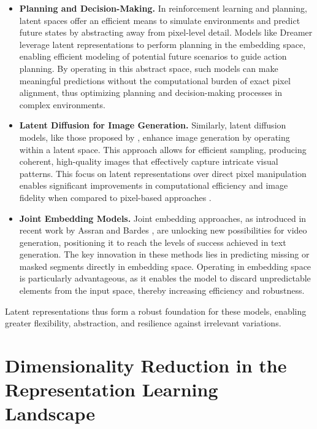 \begin{itemize}
    \item \textbf{Planning and Decision-Making.} In reinforcement learning and planning, latent spaces offer an efficient means to simulate environments and predict future states by abstracting away from pixel-level detail. Models like Dreamer \citep{hafner2019dream} leverage latent representations to perform planning in the embedding space, enabling efficient modeling of potential future scenarios to guide action planning. By operating in this abstract space, such models can make meaningful predictions without the computational burden of exact pixel alignment, thus optimizing planning and decision-making processes in complex environments.
    
    \item \textbf{Latent Diffusion for Image Generation.} Similarly, latent diffusion models, like those proposed by \cite{rombach2022high}, enhance image generation by operating within a latent space. This approach allows for efficient sampling, producing coherent, high-quality images that effectively capture intricate visual patterns. This focus on latent representations over direct pixel manipulation enables significant improvements in computational efficiency and image fidelity when compared to pixel-based approaches \citep{song2020score}.
    
    \item \textbf{Joint Embedding Models.} Joint embedding approaches, as introduced in recent work by Assran \citep{assran2023self} and Bardes \citep{bardes2023v}, are unlocking new possibilities for video generation, positioning it to reach the levels of success achieved in text generation. The key innovation in these methods lies in predicting missing or masked segments directly in embedding space. Operating in embedding space is particularly advantageous, as it enables the model to discard unpredictable elements from the input space, thereby increasing efficiency and robustness.
\end{itemize}

Latent representations thus form a robust foundation for these models, enabling greater flexibility, abstraction, and resilience against irrelevant variations.


\section{Dimensionality Reduction in the Representation Learning Landscape}

